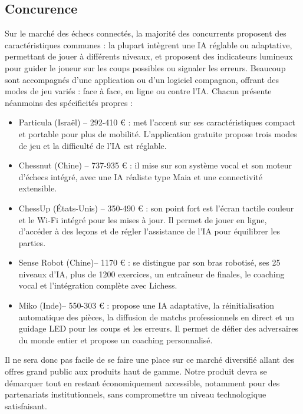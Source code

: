 \documentclass{article}
\begin{document}
\subsection{Concurence}
Sur le marché des échecs connectés, la majorité des concurrents proposent des caractéristiques communes : la plupart intègrent une IA réglable ou adaptative, permettant de jouer à différents niveaux, et proposent des indicateurs lumineux pour guider le joueur sur les coups possibles ou signaler les erreurs. Beaucoup sont accompagnés d’une application ou d’un logiciel compagnon, offrant des modes de jeu variés : face à face, en ligne ou contre l’IA. 
Chacun présente néanmoins des spécificités propres :
\begin{itemize}
    \item Particula (Israël) – 292-410 € : met l’accent sur ses caractéristiques compact et portable pour plus de mobilité. L’application gratuite propose trois modes de jeu et la difficulté de l’IA est réglable.
    \item Chessnut (Chine) – 737-935 € : il mise sur son système vocal et son moteur d’échecs intégré, avec une IA réaliste type Maia et une connectivité extensible.
    \item ChessUp (États-Unis) – 350-490 € : son point fort est l’écran tactile couleur et le Wi-Fi intégré pour les mises à jour. Il permet de jouer en ligne, d’accéder à des leçons et de régler l’assistance de l’IA pour équilibrer les parties.
    \item Sense Robot (Chine)– 1170 € : se distingue par son bras robotisé, ses 25 niveaux d’IA, plus de 1200 exercices, un entraîneur de finales, le coaching vocal et l’intégration complète avec Lichess.
    \item Miko (Inde)– 550-303 € : propose une IA adaptative, la réinitialisation automatique des pièces, la diffusion de matchs professionnels en direct et un guidage LED pour les coups et les erreurs. Il permet de défier des adversaires du monde entier et propose un coaching personnalisé.
\end{itemize}
Il ne sera donc pas facile de se faire une place sur ce marché diversifié allant des offres grand public aux produits haut de gamme. Notre produit devra se démarquer tout en restant économiquement accessible, notamment pour des partenariats institutionnels, sans compromettre un niveau technologique satisfaisant. 
\end{document}
